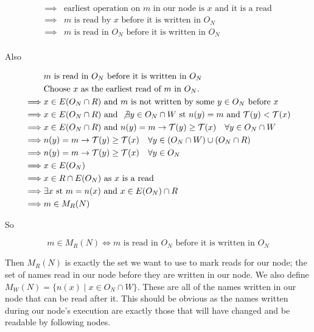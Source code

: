 \documentclass[twoside,a4paper]{report}
\begin{document}
\begin{align*}
\implies & \text{earliest operation on $m$ in our node is $x$ and it is a read} \\
\implies & \text{$m$ is read by $x$ before it is written in $O_N$} \\
\implies & \text{$m$ is read in $O_N$ before it is written in $O_N$} \\
\end{align*}

Also

\begin{align*}
         & \text{$m$ is read in $O_N$ before it is written in $O_N$} \\
         & \text{Choose $x$ as the earliest read of $m$ in $O_N$.} \\
\implies & x \in E(O_N \cap R) \text{ and $m$ is not written by some $y \in O_N$ before $x$} \\
\implies & x \in E(O_N \cap R) \text{ and } \not \exists y \in O_N \cap W \text{ st } n(y) = m \text{ and } \mathcal{T}(y) < \mathcal{T}(x) \\
\implies & x \in E(O_N \cap R) \text{ and } n(y) = m \rightarrow \mathcal{T}(y) \ge \mathcal{T}(x) \quad \forall y \in O_N \cap W \\
\implies & n(y) = m \rightarrow \mathcal{T}(y) \ge \mathcal{T}(x) \quad \forall y \in (O_N \cap W) \cup (O_N \cap R) \\
\implies & n(y) = m \rightarrow \mathcal{T}(y) \ge \mathcal{T}(x) \quad \forall y \in O_N \\
\implies & x \in E(O_N) \\
\implies & x \in R \cap E(O_N) \text{ as $x$ is a read} \\
\implies & \exists x \text{ st } m = n(x) \text{ and } x \in E(O_N) \cap R \\
\implies & m \in M_R(N)
\end{align*}

So

$$m \in M_R(N) \Leftrightarrow \text{$m$ is read in $O_N$ before it is written in $O_N$}$$

Then $M_R(N)$ is exactly the set we want to use to mark reads for our node; the set of names read in our node before they are written in our node. We also define
$M_W(N) = \{n(x) \mid x \in O_N \cap W \}$. These are all of the names written in our node that can be read after it. This should be obvious as the names written
during our node's execution are exactly those that will have changed and be readable by following nodes.
\end{document}
